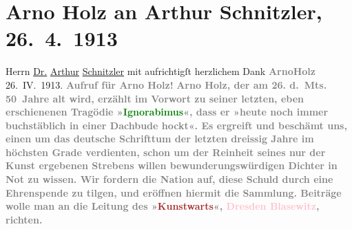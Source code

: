

               \section[Arno Holz an Arthur Schnitzler, 26. 4. 1913]{ Arno Holz an Arthur Schnitzler, 26. 4. 1913}\nopagebreak{}\rehead{ }\normalsize\beginnumbering{} \toendnotes[C]{\smallbreak\pagebreak[2]} 
\pstart
           \noindent{}{\pb}Herrn\pend
           \pstart
           \uline{Dr.}{ }\uline{Arthur}{ }\uline{Schnitzler}\pend
           \pstart
           mit aufrichtigſt herzlichem Dank\pend
           \pstart
           \centering{}\textcolor{gray}{\textbf{ArnoHolz}}\pend
           \pstart
           \noindent{}\centering{}26. IV. 1913.\pend
           \pstart
           \noindent{}\centering{}{\pb}\textcolor{gray}{\textbf{Aufruf für Arno Holz!}}\pend
           \pstart
           \noindent{}\textcolor{gray}{\textbf{Arno Holz, der am 26. d. Mts. 50 Jahre alt
                        wird, erzählt im Vorwort zu seiner letzten, eben erschienenen Tragödie »\textcolor{green}{Ignorabimus}{}\ledrightnote{\textcolor{green}{Ignoramibus}}«, dass er »heute noch immer
                        buchstäblich in einer Dachbude hockt«. Es ergreift und beschämt uns, einen
                        um das deutsche Schrifttum der letzten dreissig Jahre im höchsten Grade
                        verdienten, schon um der Reinheit seines nur der Kunst ergebenen Strebens
                        willen bewunderungswürdigen Dichter in Not zu wissen. Wir fordern die Nation
                        auf, diese Schuld durch eine Ehrenspende zu tilgen, und eröffnen hiermit die
                        Sammlung. Beiträge wolle man an die Leitung des »\textcolor{brown}{Kunstwarts}{}\ledrightnote{\textcolor{brown}{Der Kunstwart}}«, \textcolor{pink}{Dresden Blasewitz}{}\ledrightnote{\textcolor{pink}{Blasewitz}},
                        richten.}}\pend
           \pstart
